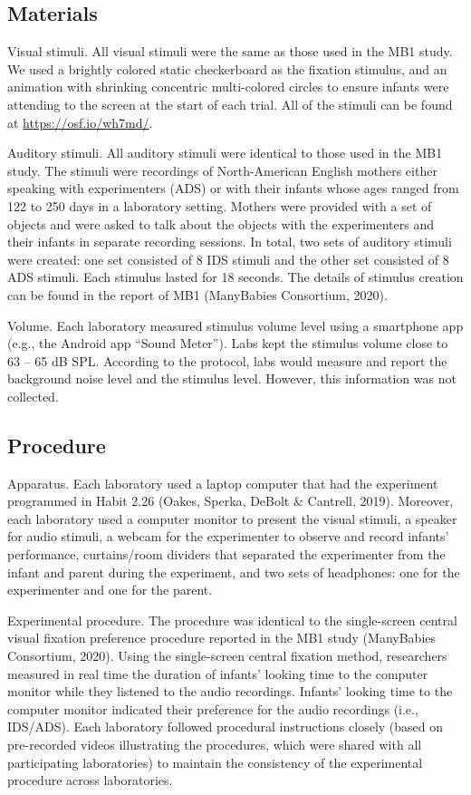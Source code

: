 \documentclass[
  ,man,floatsintext]{apa6}
\begin{document}
\hypertarget{materials}{%
\subsection{Materials}\label{materials}}

Visual stimuli. All visual stimuli were the same as those used in the MB1 study. We used a brightly colored static checkerboard as the fixation stimulus, and an animation with shrinking concentric multi-colored circles to ensure infants were attending to the screen at the start of each trial. All of the stimuli can be found at \url{https://osf.io/wh7md/}.

Auditory stimuli. All auditory stimuli were identical to those used in the MB1 study. The stimuli were recordings of North-American English mothers either speaking with experimenters (ADS) or with their infants whose ages ranged from 122 to 250 days in a laboratory setting. Mothers were provided with a set of objects and were asked to talk about the objects with the experimenters and their infants in separate recording sessions. In total, two sets of auditory stimuli were created: one set consisted of 8 IDS stimuli and the other set consisted of 8 ADS stimuli. Each stimulus lasted for 18 seconds. The details of stimulus creation can be found in the report of MB1 (ManyBabies Consortium, 2020).

Volume. Each laboratory measured stimulus volume level using a smartphone app (e.g., the Android app ``Sound Meter''). Labs kept the stimulus volume close to 63 -- 65 dB SPL. According to the protocol, labs would measure and report the background noise level and the stimulus level. However, this information was not collected.

\hypertarget{procedure}{%
\subsection{Procedure}\label{procedure}}

Apparatus. Each laboratory used a laptop computer that had the experiment programmed in Habit 2.26 (Oakes, Sperka, DeBolt \& Cantrell, 2019). Moreover, each laboratory used a computer monitor to present the visual stimuli, a speaker for audio stimuli, a webcam for the experimenter to observe and record infants' performance, curtains/room dividers that separated the experimenter from the infant and parent during the experiment, and two sets of headphones: one for the experimenter and one for the parent.

Experimental procedure. The procedure was identical to the single-screen central visual fixation preference procedure reported in the MB1 study (ManyBabies Consortium, 2020). Using the single-screen central fixation method, researchers measured in real time the duration of infants' looking time to the computer monitor while they listened to the audio recordings. Infants' looking time to the computer monitor indicated their preference for the audio recordings (i.e., IDS/ADS). Each laboratory followed procedural instructions closely (based on pre-recorded videos illustrating the procedures, which were shared with all participating laboratories) to maintain the consistency of the experimental procedure across laboratories.
\end{document}
